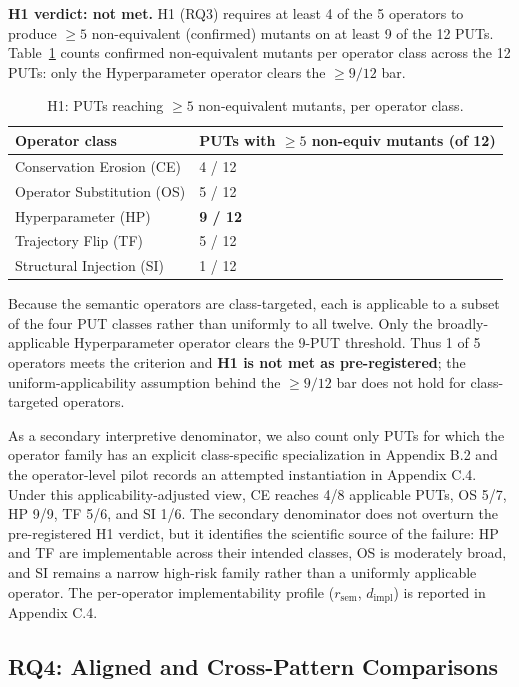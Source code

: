 \documentclass[manuscript,screen,review]{acmart}
\begin{document}
\textbf{H1 verdict: not met.} H1 (RQ3) requires at least 4 of the 5
operators to produce $\geq 5$ non-equivalent (confirmed) mutants on at
least 9 of the 12 PUTs. Table~\ref{tab:p2-32} counts confirmed
non-equivalent mutants per operator class across the 12 PUTs: only the
Hyperparameter operator clears the $\geq 9/12$ bar.

{%
\begin{longtable}[]{@{}ll@{}}
\caption{H1: PUTs reaching $\geq 5$ non-equivalent mutants, per operator
class.}\label{tab:p2-32}\\
\toprule\noalign{}
Operator class & PUTs with $\geq 5$ non-equiv mutants (of 12) \\
\midrule\noalign{}
\endfirsthead
\endhead
\bottomrule\noalign{}
\endlastfoot
Conservation Erosion (CE) & 4 / 12 \\
Operator Substitution (OS) & 5 / 12 \\
Hyperparameter (HP) & \textbf{9 / 12} \\
Trajectory Flip (TF) & 5 / 12 \\
Structural Injection (SI) & 1 / 12 \\
\end{longtable}
}

Because the semantic operators are class-targeted, each is applicable
to a subset of the four PUT classes rather than uniformly to all twelve.
Only the broadly-applicable Hyperparameter operator clears the 9-PUT
threshold. Thus 1 of 5 operators meets the criterion and \textbf{H1 is
not met as pre-registered}; the uniform-applicability assumption behind
the $\geq 9/12$ bar does not hold for class-targeted operators.

As a secondary interpretive denominator, we also count only PUTs for
which the operator family has an explicit class-specific specialization
in Appendix B.2 and the operator-level pilot records an attempted
instantiation in Appendix C.4. Under this applicability-adjusted view,
CE reaches 4/8 applicable PUTs, OS 5/7, HP 9/9, TF 5/6, and SI 1/6. The
secondary denominator does not overturn the pre-registered H1 verdict,
but it identifies the scientific source of the failure: HP and TF are
implementable across their intended classes, OS is moderately broad, and
SI remains a narrow high-risk family rather than a uniformly applicable
operator. The per-operator implementability profile ($r_{\mathrm{sem}}$,
$d_{\mathrm{impl}}$) is reported in Appendix C.4.

\subsection{RQ4: Aligned and Cross-Pattern Comparisons}\label{rq2-aligned-vs-cross-cliffs-delta}
\end{document}
